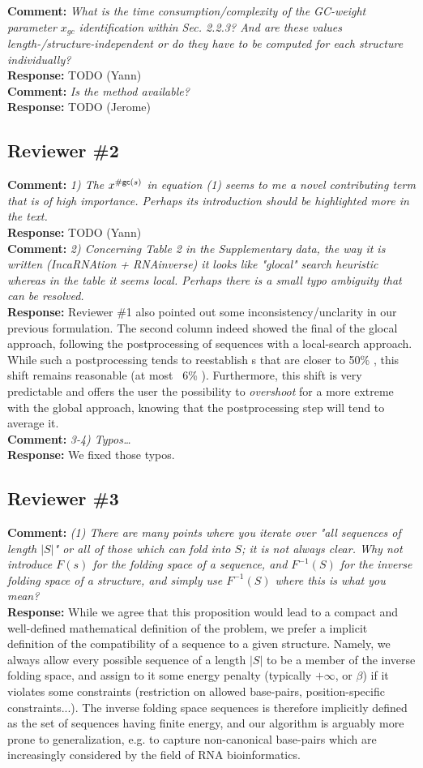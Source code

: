 \documentclass[11pt,hyperref,draft]{article} %
\newcommand{\Answer}[1]{\noindent\textsf{\textbf{Response: }}{\sf#1}\\}
\newcommand{\Comment}[1]{\noindent\textsf{\textbf{Comment: }}{\it#1}\\[.5em]}
\begin{document}
\Comment{What is the time consumption/complexity of the GC-weight parameter $x_{gc}$ identification within Sec. 2.2.3? And are these values length-/structure-independent or do they have to be computed for each structure individually?}
\Answer{TODO (Yann)}

\Comment{Is the method available?}
\Answer{TODO (Jerome)}

\subsection{Reviewer \#2}

\Comment{1) The $x^{{\#\text{{\sf gc}}}(s)}$ in equation (1) seems to me a novel contributing term that is of high importance. Perhaps its introduction should be highlighted more in the text.}
\Answer{TODO (Yann)}

\Comment{2) Concerning Table 2 in the Supplementary data, the way it is written (IncaRNAtion + RNAinverse) it looks like "glocal" search heuristic whereas in the table it seems local. Perhaps there is a small typo ambiguity that can be resolved.}
\Answer{Reviewer \#1 also pointed out some inconsistency/unclarity in our previous formulation. The second column indeed showed the final \GCContent of the glocal approach, following the postprocessing of sequences with a local-search approach. While such a postprocessing tends to reestablish \GCContent{}s that are  closer to 50\% \GC, this shift remains reasonable (at most ~6\% \GC). Furthermore, this shift is very predictable and offers the user the possibility to \emph{overshoot} for a more extreme \GCContent with the global approach, knowing that the postprocessing step will tend to average it.}

\Comment{3-4) Typos\ldots}
\Answer{We fixed those typos.}

\subsection{Reviewer \#3}

\Comment{(1) There are many points where you iterate over "all sequences of length $|S|$" or all of those which can fold into $S$; it is not always clear. Why not introduce $F(s)$ for the folding space of a sequence, and $F^{-1}(S)$ for the inverse folding space of a structure, and simply use $F^{-1}(S)$ where this is what you mean?}
\Answer{While we agree that this proposition would lead to a compact and well-defined mathematical definition of the problem, we prefer a implicit definition of the compatibility of a sequence to a given structure. Namely, we always allow every possible sequence of a length $|S|$ to be a member of the inverse folding space, and assign to it some  energy penalty (typically $+\infty$, or $\beta$) if it violates some constraints (restriction on allowed base-pairs, position-specific constraints...). The inverse folding space sequences is therefore implicitly defined as the set of sequences having finite energy, and our algorithm is arguably more prone to generalization, e.g. to capture non-canonical base-pairs which are increasingly considered by the field of RNA bioinformatics.
}
\end{document}
